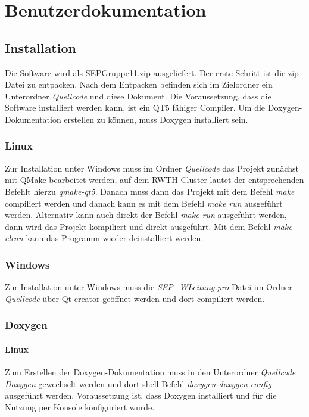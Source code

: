 \chapter{Benutzerdokumentation}

\section{Installation}
Die Software wird als SEPGruppe11.zip ausgeliefert. Der erste Schritt ist die zip-Datei zu entpacken. Nach dem Entpacken befinden sich im Zielordner ein Unterordner \emph{Quellcode} und diese Dokument.
Die Voraussetzung, dass die Software installiert werden kann, ist ein QT5 fähiger Compiler.
Um die Doxygen-Dokumentation erstellen zu können, muss Doxygen installiert sein.

\subsection{Linux}
Zur Installation unter Windows muss im Ordner \emph{Quellcode} das Projekt zunächst mit QMake bearbeitet werden, auf dem RWTH-Cluster lautet der entsprechenden Befehlt hierzu \emph{qmake-qt5}.
Danach muss dann das Projekt mit dem Befehl \emph{make} compiliert werden und danach kann es mit dem Befehl \emph{make run} ausgeführt werden. Alternativ kann auch direkt der Befehl \emph{make run} ausgeführt werden, dann wird das Projekt kompiliert und direkt ausgeführt. Mit dem Befehl \emph{make clean} kann das Programm wieder deinstalliert werden.

\subsection{Windows}
Zur Installation unter Windows muss die \emph{SEP\_WLeitung.pro} Datei im Ordner \emph{Quellcode} über Qt-creator geöffnet werden und dort compiliert werden.

\subsection{Doxygen} \label{Installation Doxygen}
\subsubsection{Linux}
Zum Erstellen der Doxygen-Dokumentation muss in den Unterordner \emph{Quellcode\\Doxygen} gewechselt werden und dort shell-Befehl \emph{doxygen doxygen-config} ausgeführt werden. Voraussetzung ist, dass Doxygen installiert und für die Nutzung per Konsole konfiguriert wurde.

